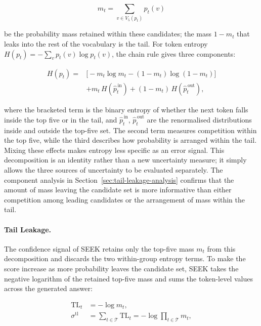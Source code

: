 \begin{equation}
    m_t = \sum_{v\in V_5(p_t)} p_t(v)
    \label{eq:topk-mass}
\end{equation}

be the probability mass retained within these candidates; the mass $1-m_t$ that leaks into the rest of the vocabulary is the tail. For token entropy $H(p_t)=-\sum_v p_t(v)\log p_t(v)$, the chain rule gives three components:

\begin{equation}
\begin{aligned}
    H(p_t)={}&\bigl[-m_t\log m_t-(1-m_t)\log(1-m_t)\bigr] \\
              &+m_t\,H(\hat{p}_t^{\,\mathrm{in}})+(1-m_t)\,H(\hat{p}_t^{\,\mathrm{out}}),
\end{aligned}
    \label{eq:entropy-chain}
\end{equation}

where the bracketed term is the binary entropy of whether the next token falls inside the top five or in the tail, and $\hat{p}_t^{\,\mathrm{in}}$, $\hat{p}_t^{\,\mathrm{out}}$ are the renormalised distributions inside and outside the top-five set. The second term measures competition within the top five, while the third describes how probability is arranged within the tail. Mixing these effects makes entropy less specific as an error signal. This decomposition is an identity rather than a new uncertainty measure; it simply allows the three sources of uncertainty to be evaluated separately. The component analysis in Section~\ref{sec:tail-leakage-analysis} confirms that the amount of mass leaving the candidate set is more informative than either competition among leading candidates or the arrangement of mass within the tail.

\paragraph{Tail Leakage.} The confidence signal of SEEK retains only the top-five mass $m_t$ from this decomposition and discards the two within-group entropy terms. To make the score increase as more probability leaves the candidate set, SEEK takes the negative logarithm of the retained top-five mass and sums the token-level values across the generated answer:

\begin{align}
    \mathrm{TL}_t
        &= -\log m_t, \label{eq:tl-token} \\
    \sigma^{\mathrm{tl}}
        &= \sum_{t\in\mathcal{T}} \mathrm{TL}_t
         = -\log \prod_{t\in\mathcal{T}} m_t , \label{eq:tail-leakage}
\end{align}

